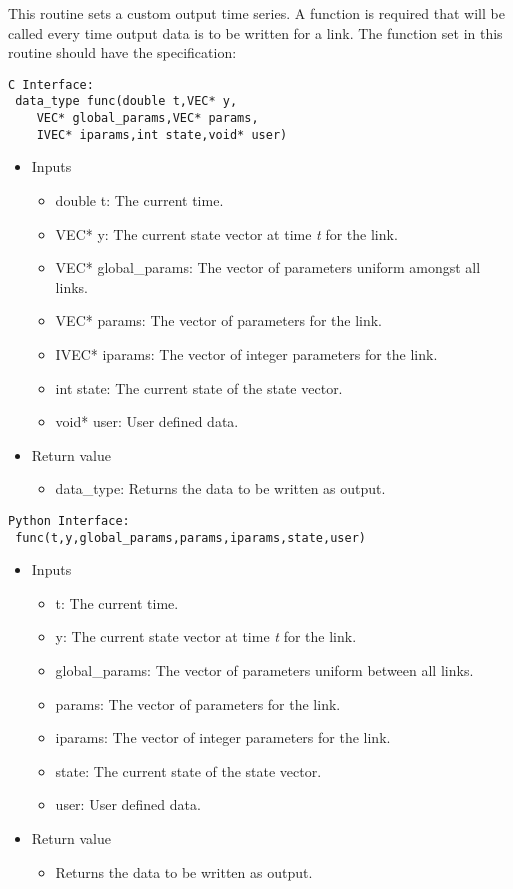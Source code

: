 \documentclass[12pt]{article}
\begin{document}
This routine sets a custom output time series. A function is required that will be called every time output data is to be written for a link. The function set in this routine should have the specification:
\begin{lstlisting}[style=CStyle]
 C Interface:
 data_type func(double t,VEC* y,
	VEC* global_params,VEC* params,
	IVEC* iparams,int state,void* user)
\end{lstlisting}
\begin{itemize}
 \item Inputs
  \begin{itemize}
   \item double t: The current time.
   \item VEC* y: The current state vector at time \emph{t} for the link.
   \item VEC* global\_params: The vector of parameters uniform amongst all links.
   \item VEC* params: The vector of parameters for the link.
   \item IVEC* iparams: The vector of integer parameters for the link.
   \item int state: The current state of the state vector.
   \item void* user: User defined data.
  \end{itemize}
 \item Return value
  \begin{itemize}
   \item data\_type: Returns the data to be written as output.
  \end{itemize}
\end{itemize}
\begin{lstlisting}[style=PythonStyle]
 Python Interface:
 func(t,y,global_params,params,iparams,state,user)
\end{lstlisting}
\begin{itemize}
 \item Inputs
  \begin{itemize}
   \item t: The current time.
   \item y: The current state vector at time \emph{t} for the link.
   \item global\_params: The vector of parameters uniform between all links.
   \item params: The vector of parameters for the link.
   \item iparams: The vector of integer parameters for the link.
   \item state: The current state of the state vector.
   \item user: User defined data.
  \end{itemize}
 \item Return value
  \begin{itemize}
   \item Returns the data to be written as output.
  \end{itemize}
\end{itemize}
\end{document}
